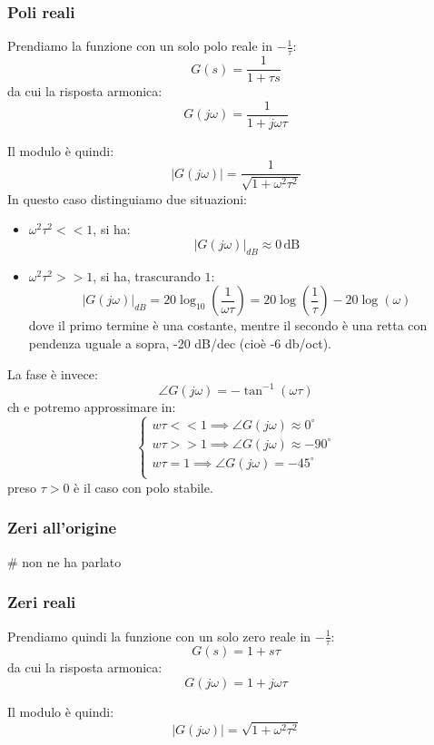 \documentclass[a4paper,11pt]{article}
\begin{document}
\subsubsection{Poli reali}
Prendiamo la funzione con un solo polo reale in $-\frac{1}{\tau}$:
$$
G(s) = \frac{1}{1 + \tau s} 
$$
da cui la risposta armonica:
$$
G(j \omega) = \frac{1}{1 + j \omega \tau}
$$

Il modulo è quindi:
$$
|G(j \omega)| = \frac{1}{\sqrt{1 + \omega^2 \tau^2}}
$$
In questo caso distinguiamo due situazioni:
\begin{itemize}
	\item $\omega^2 \tau^2 << 1$, si ha:
		$$
		|G(j\omega)|_{dB} \approx 0 \, \mathrm{dB}
		$$

	\item $\omega^2 \tau^2 >> 1$, si ha, trascurando $1$:
		$$
		|G(j \omega)|_{dB} = 20 \log_{10} \left( \frac{1}{\omega \tau} \right) =
		20 \log \left( \frac{1}{\tau} \right) - 20 \log \left( \omega \right)
		$$
		dove il primo termine è una costante, mentre il secondo è una retta con pendenza uguale a sopra, -20 dB/dec (cioè -6 db/oct).
\end{itemize}

La fase è invece:
$$
\angle G(j \omega) = - \tan^{-1} \left( \omega \tau \right)
$$
ch e potremo approssimare in:
\[
	\begin{cases}
		w \tau << 1 \implies \angle G(j\omega) \approx 0^\circ \\ 	
		w \tau >> 1 \implies \angle G(j\omega) \approx -90^\circ \\ 	
		w \tau = 1 \implies \angle G(j\omega) = -45^\circ \\ 	
	\end{cases}
\]
preso $\tau > 0$ è il caso con polo stabile.

\subsubsection{Zeri all'origine} # non ne ha parlato

\subsubsection{Zeri reali}
Prendiamo quindi la funzione con un solo zero reale in $-\frac{1}{\tau}$:
$$
G(s) = 1 + s \tau
$$
da cui la risposta armonica:
$$
G(j \omega) = 1 + j \omega \tau
$$

Il modulo è quindi:
$$
|G(j \omega)| = \sqrt{1 + \omega^2 \tau^2}
$$
\end{document}
